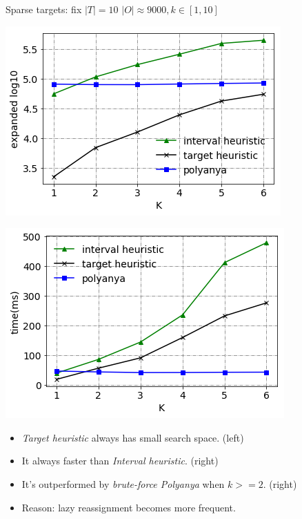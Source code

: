 \begin{frame}{Sparse targets: fix $|T|=10$}
\centering
$\scriptscriptstyle |O| \approx 9000, k \in [1, 10]$
\begin{minipage}{.5\textwidth}
    \begin{adjustbox}{max totalsize={.9\textwidth}{.9\textheight}, right}
    \centering
    \includegraphics{pic/e2_sparse_gen.png}
    \end{adjustbox}
\end{minipage}%
\begin{minipage}{.5\textwidth}
    \begin{adjustbox}{max totalsize={.9\textwidth}{.9\textheight}, right}
    \centering
    \includegraphics{pic/e2_sparse_time.png}
    \end{adjustbox}
\end{minipage}
\begin{itemize}
    \item \small{\textit{Target heuristic} always has small search space. (left)}
    \item \small{It always faster than \textit{Interval heuristic}. (right)}
    \item \small{It's outperformed by \textit{brute-force Polyanya} when $k>=2$. (right)}
    \item \small{Reason: lazy reassignment becomes more frequent.}
\end{itemize}
\end{frame}
